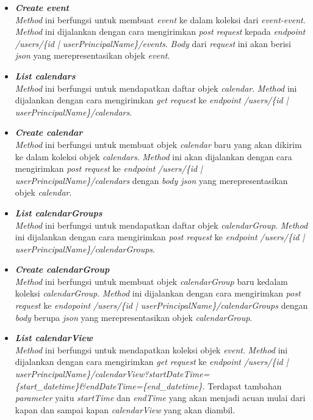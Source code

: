 \begin{itemize}
	\item \textbf{\textit{Create event}}\\
	\textit{Method} ini berfungsi untuk membuat \textit{event} ke dalam koleksi dari \textit{event-event}. \textit{Method} ini dijalankan dengan cara mengirimkan \textit{post request} kepada \textit{endpoint} \textit{/users/\{id | userPrincipalName\}/events}. \textit{Body} dari \textit{request} ini akan berisi \textit{json} yang merepresentasikan objek \textit{event}.
	\item \textbf{\textit{List calendars}}\\
	\textit{Method} ini berfungsi untuk mendapatkan daftar objek \textit{calendar}. \textit{Method} ini dijalankan dengan cara mengirimkan \textit{get request} ke \textit{endpoint} \textit{/users/\{id | userPrincipalName\}/calendars}. 
	\item \textbf{\textit{Create calendar}}\\
	\textit{Method} ini berfungsi untuk membuat objek \textit{calendar} baru yang akan dikirim ke dalam koleksi objek \textit{calendars}. \textit{Method} ini akan dijalankan dengan cara mengirimkan \textit{post request} ke \textit{endpoint} \textit{/users/\{id | userPrincipalName\}/calendars} dengan \textit{body json} yang merepresentasikan objek \textit{calendar}.
	\item \textbf{\textit{List calendarGroups}}\\
	\textit{Method} ini berfungsi untuk mendapatkan daftar objek \textit{calendarGroup}. \textit{Method} ini dijalankan dengan cara mengirimkan \textit{post request} ke \textit{endpoint} \textit{/users/\{id | userPrincipalName\}/calendarGroups}.                           
	\item \textbf{\textit{Create calendarGroup}}\\
	\textit{Method} ini berfungsi untuk membuat objek \textit{calendarGroup} baru kedalam koleksi \textit{calendarGroup}. \textit{Method} ini dijalankan dengan cara mengirimkan \textit{post request} ke \textit{endopoint} \textit{/users/\{id | userPrincipalName\}/calendarGroups} dengan \textit{body} berupa \textit{json} yang merepresentasikan objek \textit{calendarGroup}.
	\item \textbf{\textit{List calendarView}}\\
	\textit{Method} ini berfungsi untuk mendapatkan koleksi objek \textit{event}. \textit{Method} ini dijalankan dengan cara mengirimkan \textit{get request} ke \textit{endpoint} \textit{/users/\{id | userPrincipalName\}/calendarView?startDateTime=\{start\_datetime\}\&endDateTime=\{end\_datetime\}}. Terdapat tambahan \textit{parameter} yaitu \textit{startTime} dan \textit{endTime} yang akan menjadi acuan mulai dari kapan dan sampai kapan \textit{calendarView} yang akan diambil. 

\end{itemize}
